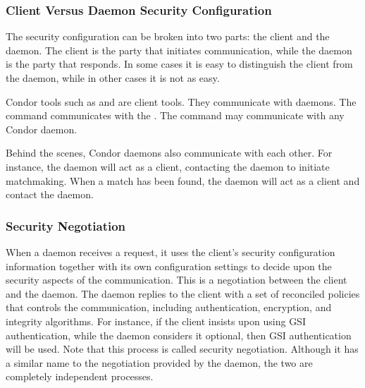 \subsubsection{\label{sec:client-vs-daemon}Client Versus Daemon
Security Configuration}

The security configuration can be broken into two parts:
the client and the daemon.
The client is the party that initiates communication,
while the daemon is the party that responds.
In some cases it is easy
to distinguish the client from the daemon, while in other cases it is 
not as easy. 

Condor tools such as  and  are
client tools.
They communicate with daemons.
The  command communicates with the .
The  command may communicate with any Condor daemon. 

Behind the scenes, Condor daemons also communicate with each other.
For instance, the  daemon will act as a client,
contacting the  daemon to initiate matchmaking.
When a match has been found,
the  daemon will act as a client and
contact the  daemon. 

\subsubsection{\label{sec:security-negotiation} Security Negotiation}

When a daemon receives a request, it uses the client's security
configuration information together with its own configuration settings
to decide upon the security aspects of the communication.
This is a negotiation between the client and the daemon.
The daemon replies to the client with a set of reconciled policies that
controls the communication, including authentication, encryption, and
integrity algorithms.
For instance, if the client insists upon using
GSI authentication,
while the daemon considers it optional,
then GSI authentication will be used. 
Note that this process is called security negotiation.
Although it has a similar name to the negotiation provided
by the  daemon,
the two are completely independent processes.

